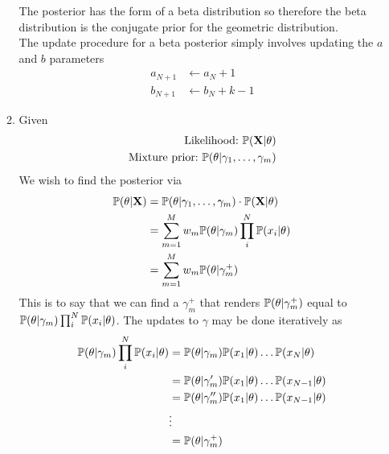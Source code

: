 \documentclass{article}
\begin{document}
\begin{enumerate}
\begin{enumerate}
                The posterior has the form of a beta distribution so
                therefore the beta distribution is the conjugate prior for
                the geometric distribution. \\
                The update procedure for a beta posterior simply involves
                updating the \(a\) and \(b\) parameters
                \begin{align*}
                    a_{N+1} &\leftarrow a_N + 1 \\
                    b_{N+1} &\leftarrow b_N + k - 1
                \end{align*}
            \item %
              Given
              \begin{align*}
                \textnormal{Likelihood:\ } \mathbb{P}(\mathbf{X}|\theta) \\
                \textnormal{Mixture prior:\ } \mathbb{P}(\theta|\gamma_1,\hdots,\gamma_m)
              \end{align*}
              We wish to find the posterior via
              \begin{align*}
                \mathbb{P}(\theta|\mathbf{X}) &= \mathbb{P}(\theta|\gamma_1,\hdots,\gamma_m)
                \cdot \mathbb{P}(\mathbf{X}|\theta) \\
                &=  \sum^M_{m=1}w_m\mathbb{P}(\theta|\gamma_m)\prod_i^N\mathbb{P}(x_i|\theta) \\
                &=  \sum^M_{m=1}w_m\mathbb{P}(\theta|\gamma_m^+) \\
              \end{align*}
              This is to say that we can find a \(\gamma_m^+\) that renders
              \(\mathbb{P}(\theta|\gamma_m^+)\) equal to
              \(\mathbb{P}(\theta|\gamma_m)\prod_i^N\mathbb{P}(x_i|\theta)\). The updates to
              \(\gamma\) may be done iteratively as
              \begin{align*}
                \mathbb{P}(\theta|\gamma_m)\prod_i^N\mathbb{P}(x_i|\theta)
                &=  \mathbb{P}(\theta|\gamma_m)\mathbb{P}(x_1|\theta)\hdots\mathbb{P}(x_N|\theta) \\
                &=  \mathbb{P}(\theta|\gamma_m^\prime)\mathbb{P}(x_1|\theta)\hdots\mathbb{P}(x_{N-1}|\theta) \\
                &=  \mathbb{P}(\theta|\gamma_m^{\prime\prime})\mathbb{P}(x_1|\theta)\hdots\mathbb{P}(x_{N-1}|\theta) \\
                &\vdots \\
                &= \mathbb{P}(\theta|\gamma_m^+) \\
              \end{align*}

\end{enumerate}
\end{enumerate}
\end{document}
